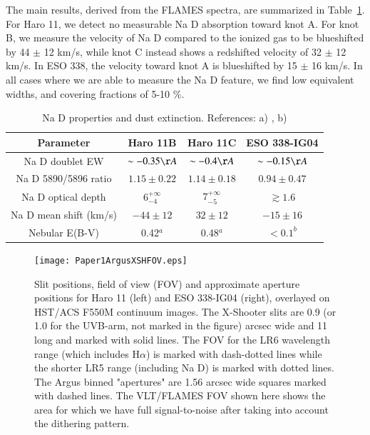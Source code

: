 \documentclass[a4wide,12pt]{book}
\begin{document}
{The main results, derived from the FLAMES spectra, are summarized in Table~\ref{Tab:NaD_ratios}. For Haro 11, we detect no measurable Na D absorption toward knot A. For knot B, we measure the velocity of Na D compared to the ionized gas to be blueshifted by 44 $\pm$ 12 km/s, while knot C instead shows a redshifted velocity of 32 $\pm$ 12 km/s. In ESO 338, the velocity toward knot A is blueshifted by 15 $\pm$ 16 km/s. In all cases where we are able to measure the Na D feature, we find low equivalent widths, and covering fractions of 5-10 \%. 

\begin{table}
\centering                          %
\begin{tabular}{c c c c}        %
\hline\hline                 %
Parameter & Haro 11B & Haro 11C & ESO 338-IG04 \\    %
\hline                        %
  Na D doublet EW & $\sim -0.35 \AA$ & $\sim -0.4 \AA$ & $\sim -0.15 \AA$ \\
   Na D 5890/5896 ratio & $1.15\pm0.22$ & $1.14\pm0.18$ & $0.94\pm0.47$ \\      
   Na D optical depth & $6^{+\infty}_{-4}$ & $7^{+\infty}_{-5}$ & $\gtrsim 1.6$  \\
   Na D mean shift (km/s) & $-44 \pm 12$  & $32 \pm 12$  & $-15 \pm 16$  \\
   Nebular E(B-V) & 0.42$^{a}$ & 0.48$^{a}$ & $<0.1^{b}$ \\
\hline                                   %
\end{tabular}
\caption{Na D properties and dust extinction. References: a) \citet{hayes-2007}, b) \citet{bergvall-ostlin2002} }   \label{Tab:NaD_ratios}      %
\end{table}

   \begin{figure}
   \centering
   \texttt{[image: Paper1ArgusXSHFOV.eps]}
   \caption{Slit positions, field of view (FOV) and approximate aperture positions for Haro 11 (left) and ESO 338-IG04 (right), overlayed on HST/ACS F550M continuum images. The X-Shooter slits are 0.9 (or 1.0 for the UVB-arm, not marked in the figure) arcsec wide and 11 long and marked with solid lines. The FOV for the LR6 wavelength range (which includes H$\alpha$) is marked with dash-dotted lines while the shorter LR5 range (including Na D) is marked with dotted lines. The Argus binned "apertures" are 1.56 arcsec wide squares marked with dashed lines. The VLT/FLAMES FOV shown here shows the area for which we have full signal-to-noise after taking into account the dithering pattern. }
              \label{Fig:Slits}
    \end{figure}

}
\end{document}
